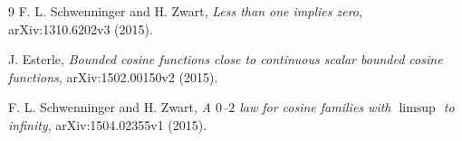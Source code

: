 \documentclass[11pt]{article}
\begin{document}
\begin{thebibliography}{9}
F. L. Schwenninger and H. Zwart,
\emph{Less than one implies zero}, arXiv:1310.6202v3 (2015).

J. Esterle,
\emph{Bounded cosine functions close to continuous scalar bounded cosine
functions}, arXiv:1502.00150v2 (2015).

F. L. Schwenninger and H. Zwart,
\emph{A $0$--$2$ law for cosine families with $\limsup$ to infinity},
arXiv:1504.02355v1 (2015).
\end{thebibliography}
\end{document}
